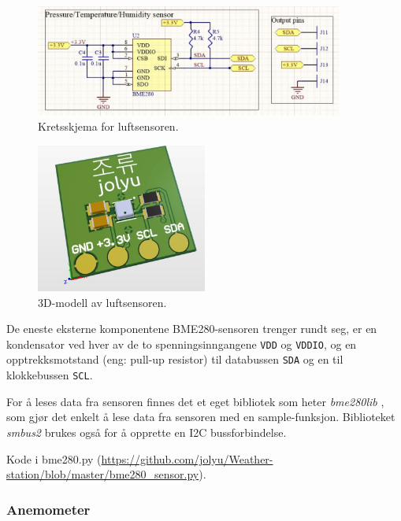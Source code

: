 \begin{figure}[H]
    \centering
    \includegraphics[width=0.9\textwidth]{implementering/luftsensor_krets.png}
    \caption{Kretsskjema for luftsensoren.}
    \label{fig:luftsensor_krets-}
\end{figure}

\begin{figure}[H]
    \centering
    \includegraphics[width=0.5\textwidth]{implementering/luftsensor_3d.png}
    \caption{3D-modell av luftsensoren.}
    \label{fig:luftsensor_3d}
\end{figure}

De eneste eksterne komponentene BME280-sensoren trenger rundt seg, er en kondensator ved hver av de to spenningsinngangene \texttt{VDD} og \texttt{VDDIO}, og en opptrekksmotstand (eng: pull-up resistor) til databussen \texttt{SDA} og en til klokkebussen \texttt{SCL}.

For å leses data fra sensoren finnes det et eget bibliotek som heter \textit{bme280lib} \cite{bme280lib}, som gjør det enkelt å lese data fra sensoren med en sample-funksjon. 
Biblioteket \textit{smbus2} \cite{smbus2} brukes også for å opprette en I2C bussforbindelse.

Kode i bme280.py (\url{https://github.com/jolyu/Weather-station/blob/master/bme280_sensor.py}). 

\subsubsection{Anemometer}\label{sec:impl:vaer:anemometer}

